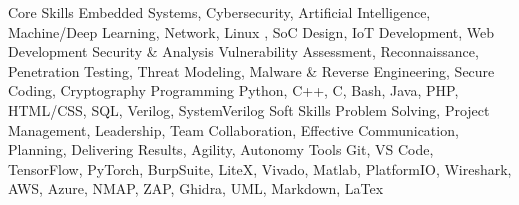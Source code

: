 

\begin{cvskills}
  \cvskill
    {Core Skills} %
    {Embedded Systems, Cybersecurity, Artificial Intelligence, Machine/Deep Learning, Network, Linux
   , SoC Design, IoT Development, Web Development} %
  \cvskill
    {Security \& Analysis} %
    {Vulnerability Assessment, Reconnaissance, Penetration Testing, Threat
    Modeling, Malware \& Reverse Engineering, Secure Coding, Cryptography} %
  \cvskill
    {Programming}
    {Python, C++, C, Bash, Java, PHP, HTML/CSS, SQL, Verilog, SystemVerilog}
  \cvskill
    {Soft Skills}
    {Problem Solving, Project Management, Leadership, Team Collaboration,
    Effective Communication, Planning, Delivering Results, Agility, Autonomy}
  \cvskill
    {Tools} %
    {Git, VS Code, TensorFlow, PyTorch, BurpSuite, LiteX, Vivado, Matlab,
    PlatformIO, Wireshark, AWS, Azure, NMAP, ZAP, Ghidra, UML, Markdown, LaTex } %
\end{cvskills}
